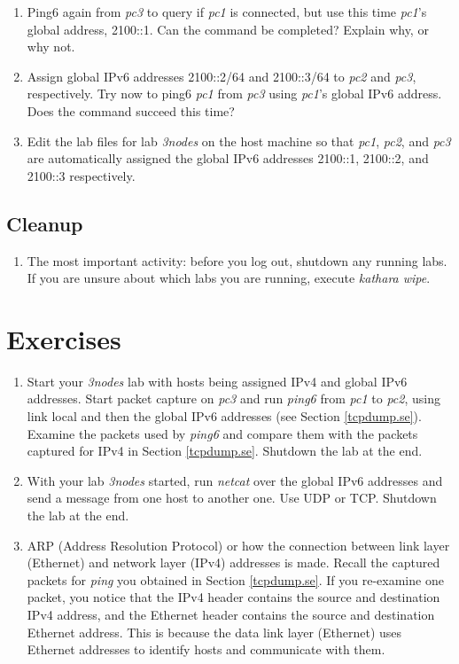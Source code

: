 \documentclass[12pt]{book}
\begin{document}
\begin{enumerate}[label=\arabic*.]
\begin{enumerate}[resume*]
\item Ping6 again from \emph{pc3} to query if \emph{pc1} is connected, but use this time \emph{pc1}'s global address, 2100::1. Can the command be completed? Explain why, or why not.

\item Assign global IPv6 addresses 2100::2/64 and 2100::3/64 to \emph{pc2} and \emph{pc3}, respectively. Try now to ping6 \emph{pc1} from \emph{pc3} using \emph{pc1}'s global IPv6 address. Does the command succeed this time?

  \item Edit the lab files for lab \emph{3nodes} on the host machine so that \emph{pc1}, \emph{pc2}, and \emph{pc3} are automatically assigned the global IPv6 addresses 2100::1, 2100::2, and 2100::3 respectively.
\end{enumerate}

\subsection{Cleanup}

\begin{enumerate}[resume*]
\item The most important activity: before you log out, shutdown any running labs. If you are unsure about which labs you are running, execute \emph{kathara wipe}.
\end{enumerate}


\section{Exercises}

\begin{enumerate}
\item Start your \emph{3nodes} lab with hosts being assigned IPv4 and global IPv6 addresses. Start packet capture on \emph{pc3} and run \emph{ping6} from \emph{pc1} to \emph{pc2}, using link local and then the global IPv6 addresses (see Section \ref{tcpdump.se}). Examine the packets used by \emph{ping6} and compare them with the packets captured for IPv4 in Section \ref{tcpdump.se}. Shutdown the lab at the end.
  
\item With your lab \emph{3nodes} started, run \emph{netcat} over the global IPv6 addresses and send a message from one host to another one. Use UDP or TCP. Shutdown the lab at the end.

\item\label{arp} ARP (Address Resolution Protocol) or how the connection between link layer (Ethernet) and network layer (IPv4) addresses is made. Recall the captured packets for \emph{ping} you obtained in Section \ref{tcpdump.se}. If you re-examine one packet, you notice that the IPv4 header contains the source and destination IPv4 address, and the Ethernet header contains the source and destination Ethernet address. This is because the data link layer (Ethernet) uses Ethernet addresses to identify hosts and communicate with them.


\end{enumerate}
\end{enumerate}
\end{document}
